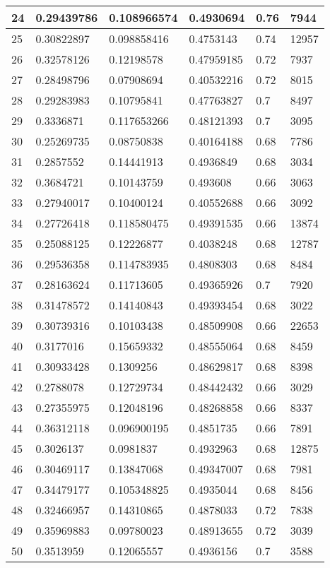 \begin{longtable}{|l|l|l|l|l|l|}
24 & 0.29439786 & 0.108966574 & 0.4930694 & 0.76 & 7944 \\ \hline 
25 & 0.30822897 & 0.098858416 & 0.4753143 & 0.74 & 12957 \\ \hline 
26 & 0.32578126 & 0.12198578 & 0.47959185 & 0.72 & 7937 \\ \hline 
27 & 0.28498796 & 0.07908694 & 0.40532216 & 0.72 & 8015 \\ \hline 
28 & 0.29283983 & 0.10795841 & 0.47763827 & 0.7 & 8497 \\ \hline 
29 & 0.3336871 & 0.117653266 & 0.48121393 & 0.7 & 3095 \\ \hline 
30 & 0.25269735 & 0.08750838 & 0.40164188 & 0.68 & 7786 \\ \hline 
31 & 0.2857552 & 0.14441913 & 0.4936849 & 0.68 & 3034 \\ \hline 
32 & 0.3684721 & 0.10143759 & 0.493608 & 0.66 & 3063 \\ \hline 
33 & 0.27940017 & 0.10400124 & 0.40552688 & 0.66 & 3092 \\ \hline 
34 & 0.27726418 & 0.118580475 & 0.49391535 & 0.66 & 13874 \\ \hline 
35 & 0.25088125 & 0.12226877 & 0.4038248 & 0.68 & 12787 \\ \hline 
36 & 0.29536358 & 0.114783935 & 0.4808303 & 0.68 & 8484 \\ \hline 
37 & 0.28163624 & 0.11713605 & 0.49365926 & 0.7 & 7920 \\ \hline 
38 & 0.31478572 & 0.14140843 & 0.49393454 & 0.68 & 3022 \\ \hline 
39 & 0.30739316 & 0.10103438 & 0.48509908 & 0.66 & 22653 \\ \hline 
40 & 0.3177016 & 0.15659332 & 0.48555064 & 0.68 & 8459 \\ \hline 
41 & 0.30933428 & 0.1309256 & 0.48629817 & 0.68 & 8398 \\ \hline 
42 & 0.2788078 & 0.12729734 & 0.48442432 & 0.66 & 3029 \\ \hline 
43 & 0.27355975 & 0.12048196 & 0.48268858 & 0.66 & 8337 \\ \hline 
44 & 0.36312118 & 0.096900195 & 0.4851735 & 0.66 & 7891 \\ \hline 
45 & 0.3026137 & 0.0981837 & 0.4932963 & 0.68 & 12875 \\ \hline 
46 & 0.30469117 & 0.13847068 & 0.49347007 & 0.68 & 7981 \\ \hline 
47 & 0.34479177 & 0.105348825 & 0.4935044 & 0.68 & 8456 \\ \hline 
48 & 0.32466957 & 0.14310865 & 0.4878033 & 0.72 & 7838 \\ \hline 
49 & 0.35969883 & 0.09780023 & 0.48913655 & 0.72 & 3039 \\ \hline 
50 & 0.3513959 & 0.12065557 & 0.4936156 & 0.7 & 3588 \\ \hline 
\end{longtable}